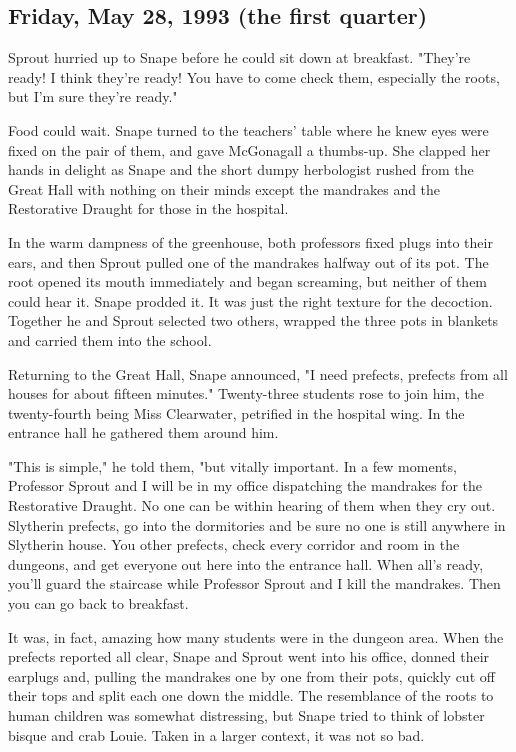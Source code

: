 \sbreak

\subsection{Friday, May 28, 1993 (the first quarter)}

Sprout hurried up to Snape before he could sit down at breakfast. "They're ready! I think they're ready! You have to come check them, especially the roots, but I'm sure they're ready."

Food could wait. Snape turned to the teachers' table where he knew eyes were fixed on the pair of them, and gave McGonagall a thumbs-up. She clapped her hands in delight as Snape and the short dumpy herbologist rushed from the Great Hall with nothing on their minds except the mandrakes and the Restorative Draught for those in the hospital.

In the warm dampness of the greenhouse, both professors fixed plugs into their ears, and then Sprout pulled one of the mandrakes halfway out of its pot. The root opened its mouth immediately and began screaming, but neither of them could hear it. Snape prodded it. It was just the right texture for the decoction. Together he and Sprout selected two others, wrapped the three pots in blankets and carried them into the school.

Returning to the Great Hall, Snape announced, "I need prefects, prefects from all houses for about fifteen minutes." Twenty-three students rose to join him, the twenty-fourth being Miss Clearwater, petrified in the hospital wing. In the entrance hall he gathered them around him.

"This is simple," he told them, "but vitally important. In a few moments, Professor Sprout and I will be in my office dispatching the mandrakes for the Restorative Draught. No one can be within hearing of them when they cry out. Slytherin prefects, go into the dormitories and be sure no one is still anywhere in Slytherin house. You other prefects, check every corridor and room in the dungeons, and get everyone out here into the entrance hall. When all's ready, you'll guard the staircase while Professor Sprout and I kill the mandrakes. Then you can go back to breakfast.

It was, in fact, amazing how many students were in the dungeon area. When the prefects reported all clear, Snape and Sprout went into his office, donned their earplugs and, pulling the mandrakes one by one from their pots, quickly cut off their tops and split each one down the middle. The resemblance of the roots to human children was somewhat distressing, but Snape tried to think of lobster bisque and crab Louie. Taken in a larger context, it was not so bad.

